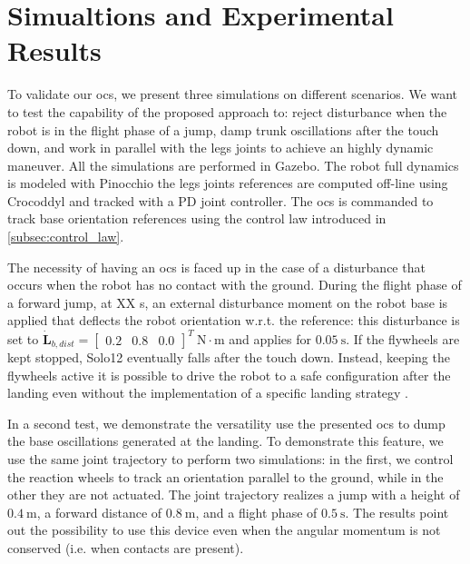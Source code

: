 \documentclass[letterpaper, 10 pt, conference]{ieeeconf}  %
\begin{document}
\section{Simualtions and Experimental Results}
To validate our \gls{ocs}, we present three simulations on different scenarios. We want to test the capability of the proposed approach to: 
reject disturbance when the robot is in the flight phase of a jump, damp trunk oscillations after the touch down, 
and work in parallel with the legs joints to achieve an highly dynamic maneuver. 
All the simulations are performed in Gazebo. The robot full dynamics is modeled with Pinocchio \cite{carpentier2019pinocchio} the legs joints references are computed off-line using Crocoddyl \cite{mastalli2020crocoddyl} and tracked with a PD joint controller. The \gls{ocs} is commanded to 
track base orientation references using the control law introduced in \ref{subsec:control_law}.

The necessity of having an \gls{ocs} is faced up in the case of a disturbance that occurs when the robot has no contact with the ground. 
During the flight phase of a forward jump, at XX s, an external disturbance  moment on the robot base is applied that deflects 
the robot orientation w.r.t. the reference: this disturbance is set to $\dot{\bm{L}}_{b, dist} = \left[\begin{array}{ccc}
0.2 & 0.8 & 0.0
\end{array}
\right]^T \ \mathrm{N \cdot m}$ and applies for $0.05 \ \mathrm{s}$. 
If the flywheels are kept stopped, Solo12 eventually falls after the touch down. Instead, 
keeping the flywheels active  %
it is possible to drive the robot to a safe configuration after the landing 
even without the implementation of a specific landing strategy \cite{}.

In a second test, we demonstrate the versatility use the presented \gls{ocs} to dump the base oscillations generated at the landing. 
To demonstrate this feature, we use the same joint trajectory to perform two simulations: 
in the first, we control the reaction wheels to track an orientation parallel to the ground, while in the other they are not actuated.
The joint trajectory realizes a jump with a height of $0.4 \ \mathrm{m}$, a forward distance of $0.8 \ \mathrm{m}$, and a flight phase of $0.5 \ \mathrm{s}$. 
The results point out the possibility to use this device even when the angular momentum is not conserved (i.e. when contacts are present).
\end{document}
